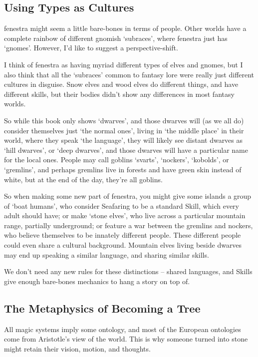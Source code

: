 \begin{multicols}{2}
\subsection{Using Types as Cultures}

\Gls{fenestra} might seem a little bare-bones in terms of people.
Other worlds have a complete rainbow of different gnomish `subraces', where \gls{fenestra} just has `gnomes'.
However, I'd like to suggest a perspective-shift.

I think of \gls{fenestra} as having myriad different types of elves and gnomes, but I also think that all the `subraces' common to fantasy lore were really just different cultures in disguise.
Snow elves and wood elves do different things, and have different skills, but their bodies didn't show any differences in most fantasy worlds.

So while this book only shows `dwarves', and those dwarves will (as we all do) consider themselves just `the normal ones', living in `the middle place' in their world, where they speak `the language', they will likely see distant dwarves as `hill dwarves', or `deep dwarves', and those dwarves will have a particular name for the local ones.
People may call goblins `svarts', `nockers', `kobolds', or `gremlins', and perhaps gremlins live in forests and have green skin instead of white, but at the end of the day, they're all goblins.

So when making some new part of \gls{fenestra}, you might give some islands a group of `boat humans', who consider Seafaring to be a standard Skill, which every adult should have; or make `stone elves', who live across a particular mountain range, partially underground; or feature a war between the gremlins and nockers, who believe themselves to be innately different people.
These different people could even share a cultural background.
Mountain elves living beside dwarves may end up speaking a similar language, and sharing similar skills.

We don't need any new rules for these distinctions -- shared languages, and Skills give enough bare-bones mechanics to hang a story on top of.

\subsection{The Metaphysics of Becoming a Tree}

All magic systems imply some ontology, and most of the European ontologies come from Aristotle's view of the world.
This is why someone turned into stone might retain their vision, motion, and thoughts.


\end{multicols}
